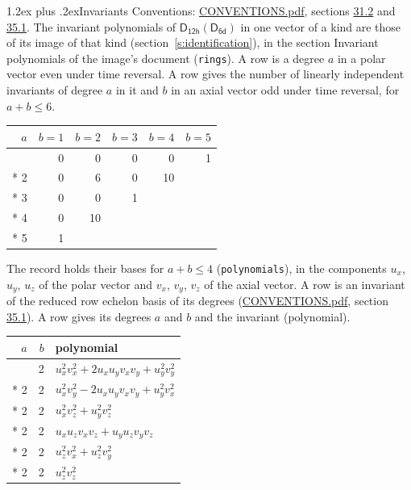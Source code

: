 \documentclass[10pt,a4paper]{article}
\makeatletter
\renewcommand\section{\@startsection{section}{1}{\z@}{-3ex plus -1ex minus -.2ex}%
  {1.2ex plus .2ex}{\normalfont\large\sffamily\bfseries\color{parttitle}}}
\numberwithin{equation}{section}
\newcommand{\grp}[1]{\mathsf{#1}}
\makeatother
\begin{document}
\section{Invariants}\label{s:invariants}
Conventions: \href{../../CONVENTIONS.pdf}{CONVENTIONS.pdf}, sections \href{../../CONVENTIONS.pdf\#conv.31.2}{31.2} and \href{../../CONVENTIONS.pdf\#conv.35.1}{35.1}.
The invariant polynomials of $\grp{D_{12h}}(\grp{D_{6d}})$ in one vector of a kind are those of its image of that kind (section~\ref{s:identification}), in the section Invariant polynomials of the image's document (\texttt{rings}).
\leavevmode\label{n:index.degree.polar}\label{n:index.degree.axial}A row is a degree $a$ in a polar vector even under time reversal. A row gives the number of linearly independent invariants of degree $a$ in it and $b$ in an axial vector odd under time reversal, for $a + b \le 6$.
{\small\begin{longtable}{@{}rrrrrr@{}}\toprule
$a$ & $b = 1$ & $b = 2$ & $b = 3$ & $b = 4$ & $b = 5$\\\midrule\endhead
\bottomrule\endfoot\endlastfoot
1 & 0 & 0 & 0 & 0 & 1\\*
2 & 0 & 6 & 0 & 10 & \\*
3 & 0 & 0 & 1 &  & \\*
4 & 0 & 10 &  &  & \\*
5 & 1 &  &  &  & \\
\bottomrule\end{longtable}}
\leavevmode\label{n:local.component.polar}\label{n:local.component.axial}The record holds their bases for $a + b \le 4$ (\texttt{polynomials}), in the components $u_{x}$, $u_{y}$, $u_{z}$ of the polar vector and $v_{x}$, $v_{y}$, $v_{z}$ of the axial vector. \label{n:head.polynomial}A row is an invariant of the reduced row echelon basis of its degrees (\href{../../CONVENTIONS.pdf}{CONVENTIONS.pdf}, section \href{../../CONVENTIONS.pdf\#conv.35.1}{35.1}). A row gives its degrees $a$ and $b$ and the invariant (polynomial).
{\small\renewcommand{\arraystretch}{1.2}\begin{longtable}{@{}rrl@{}}\toprule
$a$ & $b$ & polynomial\\\midrule\endhead
\bottomrule\endfoot\endlastfoot
2 & 2 & $u_{x}^{2}v_{x}^{2} + 2u_{x}u_{y}v_{x}v_{y} + u_{y}^{2}v_{y}^{2}$\\*
2 & 2 & $u_{x}^{2}v_{y}^{2} - 2u_{x}u_{y}v_{x}v_{y} + u_{y}^{2}v_{x}^{2}$\\*
2 & 2 & $u_{x}^{2}v_{z}^{2} + u_{y}^{2}v_{z}^{2}$\\*
2 & 2 & $u_{x}u_{z}v_{x}v_{z} + u_{y}u_{z}v_{y}v_{z}$\\*
2 & 2 & $u_{z}^{2}v_{x}^{2} + u_{z}^{2}v_{y}^{2}$\\*
2 & 2 & $u_{z}^{2}v_{z}^{2}$\\
\bottomrule\end{longtable}}
\end{document}
